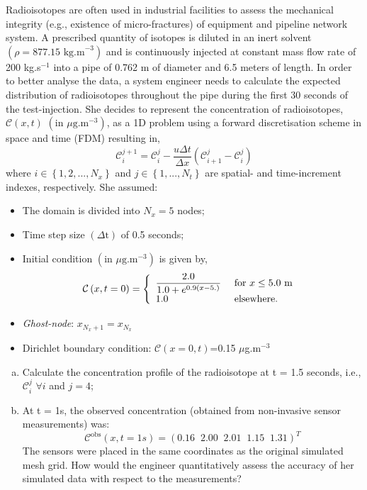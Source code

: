\documentclass[calculator,datasheet]{exam}
\begin{document}
\begin{question} 
Radioisotopes are often used in industrial facilities to assess the mechanical integrity (e.g., existence of micro-fractures) of equipment and pipeline network system. A prescribed quantity of isotopes is diluted in an inert solvent $\left(\rho=\text{877.15 kg.m}^{-3}\right)$ and is continuously injected at constant mass flow rate of 200 kg.s$^{-1}$ into a pipe of 0.762 m of diameter and 6.5 meters of length.  In order to better analyse the data, a system engineer needs to calculate the expected distribution of radioisotopes throughout the pipe during the first 30 seconds of the test-injection. She decides to represent the concentration of radioisotopes, $\mathcal{C}\left(x,t\right)$ $\left(\text{in }\mu\text{g.m}^{-3}\right)$, as a 1D problem using a forward discretisation scheme in space and time (FDM) resulting in,
\begin{displaymath}
\mathcal{C}_{i}^{j+1}=\mathcal{C}_{i}^{j} - \frac{u\Delta t}{\Delta x }\left(\mathcal{C}_{i+1}^{j}-\mathcal{C}_{i}^{j}\right)
\end{displaymath}
where $i\in\left\{1,2,...,N_{x}\right\}$ and $j\in\left\{1,...,N_{t}\right\}$ are spatial- and time-increment indexes, respectively. She assumed:
\begin{itemize}
\item The domain is divided into $N_{x}=5$ nodes;
\item Time step size $\left(\Delta\text{t}\right)$ of 0.5 seconds;
\item Initial condition $\left(\text{in }\mu\text{g.m}^{-3}\right)$ is given by,
\[
\mathcal{C}\left(x,t=0\right)=
\left\{\begin{array}{l l}
\displaystyle\frac{2.0}{1.0 + e^{0.9\left(x-5.\right)}}  & \text{ for }  x \le 5.0 \text{ m }\\
1.0 & \text{ elsewhere.}
\end{array}\right.\]
\item {\it Ghost-node}: $x_{N_{x}+1}=x_{N_{x}}$
\item Dirichlet boundary condition: $\mathcal{C}\left(x=0,t\right)$=0.15 $\mu$g.m$^{-3}$
\end{itemize}
\begin{enumerate}[(a)]
\item Calculate the concentration profile of the radioisotope at t = 1.5 seconds, i.e., $\mathcal{C}_{i}^{j}$ $\forall i$ and $j=4$;~ 
\item At t = 1s, the observed concentration (obtained from non-invasive sensor measurements) was:
\begin{displaymath}
\mathcal{C}^{\text{obs}}\left(x,t=1s\right)= \left(0.16 \;\; 2.00 \;\; 2.01 \;\; 1.15 \;\; 1.31\right)^{T}
\end{displaymath}
The sensors were placed in the same coordinates as the original simulated mesh grid. How would the engineer quantitatively assess the accuracy of her simulated data with respect to the measurements?~ 
\end{enumerate}

\end{question}
\end{document}
